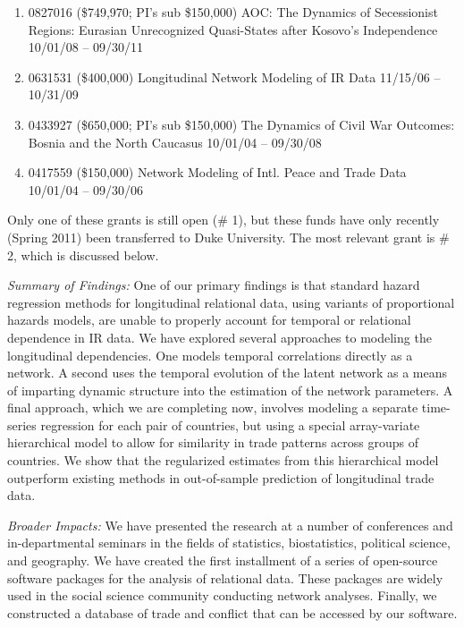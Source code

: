 \documentclass[pdftex,12pt,fullpage,oneside]{amsart}
\begin{document}
\begin{enumerate}

\item 0827016 (\$749,970; PI's sub \$150,000) AOC: The Dynamics of
  Secessionist Regions: Eurasian Unrecognized Quasi-States after
  Kosovo's Independence 10/01/08 -- 09/30/11

\item 0631531 (\$400,000) Longitudinal Network Modeling of
  IR Data  11/15/06 -- 10/31/09

\item 0433927 (\$650,000; PI's sub \$150,000) The Dynamics of Civil
  War Outcomes: Bosnia and the North Caucasus 10/01/04 -- 09/30/08

\item 0417559 (\$150,000) Network Modeling of Intl. Peace and
  Trade Data 10/01/04 -- 09/30/06

\end{enumerate}  Only one of these grants is still open (\# 1), but these funds have
only recently (Spring 2011) been transferred to Duke University. The
most relevant grant is \# 2, which is discussed below. \vspace{.1in}

\textit{Summary of Findings:} One of our primary findings is that
standard hazard regression methods for longitudinal relational data,
using variants of proportional hazards models, are unable to properly
account for temporal or relational dependence in IR data. We have
explored several approaches to modeling the longitudinal dependencies.
One models temporal correlations directly as a network.  A second uses
the temporal evolution of the latent network as a means of imparting
dynamic structure into the estimation of the network parameters.  A
final approach, which we are completing now, involves modeling a
separate time-series regression for each pair of countries, but using
a special array-variate hierarchical model to allow for similarity in
trade patterns across groups of countries. We show that the
regularized estimates from this hierarchical model outperform existing
methods in out-of-sample prediction of longitudinal trade data.

\textit{Broader Impacts:} We have presented the research at a number
of conferences and in-departmental seminars in the fields of
statistics, biostatistics, political science, and geography. We have
created the first installment of a series of open-source software
packages for the analysis of relational data. These packages are
widely used in the social science community conducting network
analyses. Finally, we constructed a database of trade and conflict
that can be accessed by our software.
\end{document}
